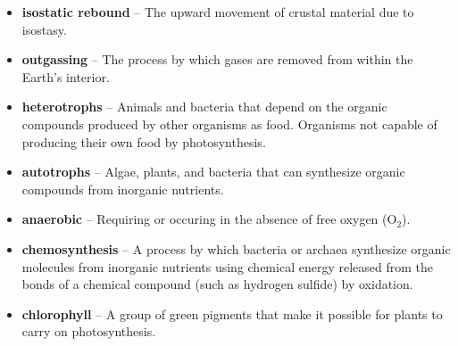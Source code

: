 \begin{itemize}
	\item \textbf{isostatic rebound} -- The upward movement of crustal
		material due to isostasy.
	\item \textbf{outgassing} -- The process by which gases are removed
		from within the Earth's interior.
	\item \textbf{heterotrophs} -- Animals and bacteria that depend on the
		organic compounds produced by other organisms as food.
		Organisms not capable of producing their own food by
		photosynthesis.
	\item \textbf{autotrophs} -- Algae, plants, and bacteria that can
		synthesize organic compounds from inorganic nutrients.
	\item \textbf{anaerobic} -- Requiring or occuring in the absence of
		free oxygen (O$_2$).
	\item \textbf{chemosynthesis} -- A process by which bacteria or
		archaea synthesize organic molecules from inorganic nutrients
		using chemical energy released from the bonds of a chemical
		compound (such as hydrogen sulfide) by oxidation.
	\item \textbf{chlorophyll} -- A group of green pigments that make it
		possible for plants to carry on photosynthesis.
\end{itemize}
